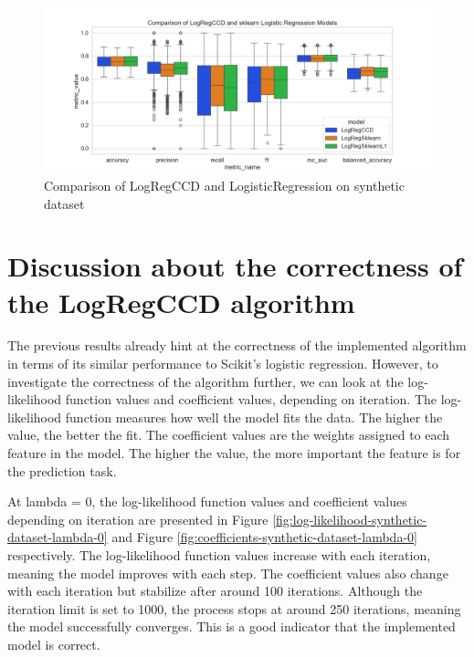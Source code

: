 \documentclass[11pt]{article}
\begin{document}
\begin{figure}[h]
    \centering
  \includegraphics[width=\textwidth]{../results/comparison-synthetic-dataset.png}
    \caption{Comparison of LogRegCCD and LogisticRegression on synthetic dataset}
    \label{fig:comparison-synthetic-dataset}
  \end{figure}



\section{Discussion about the correctness of the LogRegCCD algorithm}

The previous results already hint at the correctness of the implemented algorithm in terms of its similar performance to Scikit's logistic regression. However, to investigate the correctness of the algorithm further, we can look at the log-likelihood function values and coefficient values, depending on iteration. The log-likelihood function measures how well the model fits the data. The higher the value, the better the fit. The coefficient values are the weights assigned to each feature in the model. The higher the value, the more important the feature is for the prediction task. \par

At lambda = 0, the log-likelihood function values and coefficient values depending on iteration are presented in Figure \ref{fig:log-likelihood-synthetic-dataset-lambda-0} and Figure \ref{fig:coefficients-synthetic-dataset-lambda-0} respectively. The log-likelihood function values increase with each iteration, meaning the model improves with each step. The coefficient values also change with each iteration but stabilize after around 100 iterations. Although the iteration limit is set to 1000, the process stops at around 250 iterations, meaning the model successfully converges. This is a good indicator that the implemented model is correct.\par
\end{document}

